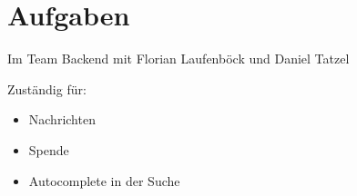 \section{Aufgaben} %

\begin{frame} %
	Im Team Backend mit Florian Laufenböck und Daniel Tatzel
	
	Zuständig für:
	\begin{itemize}
	\item Nachrichten
	\item Spende
	\item Autocomplete in der Suche
	\end{itemize}
\end{frame}
